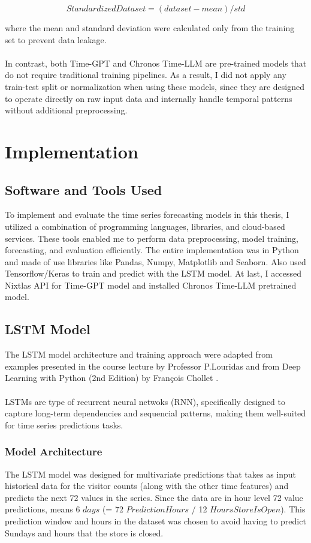 \documentclass{article}
\begin{document}
\begin{equation}
    Standardized Dataset = (dataset - mean) / std
\end{equation}

where the mean and standard deviation were calculated only from the training set to prevent data leakage.\\
\\
In contrast, both Time-GPT and Chronos Time-LLM are pre-trained models that do not require traditional training pipelines. As a result, I did not apply any train-test split or normalization when using these models, since they are designed to operate directly on raw input data and internally handle temporal patterns without additional preprocessing.

\newpage
\section{Implementation}
\subsection{Software and Tools Used}

To implement and evaluate the time series forecasting models in this thesis, I utilized a combination of programming languages, libraries, and cloud-based services. These tools enabled me to perform data preprocessing, model training, forecasting, and evaluation efficiently.
The entire implementation was in Python and made of use libraries like Pandas, Numpy, Matplotlib and Seaborn. Also used Tensorflow/Keras to train and predict with the LSTM model. At last, I accessed Nixtlas API for Time-GPT model and installed Chronos Time-LLM pretrained model.


\subsection{LSTM Model}
The LSTM model architecture and training approach were adapted from examples presented in the course lecture by Professor P.Louridas and from Deep Learning with Python (2nd Edition) by François Chollet \cite{Francois}. \\
\\
LSTMs are type of recurrent neural netwoks (RNN), specifically designed to capture long-term dependencies and sequencial patterns, making them well-suited for time series predictions tasks.

\subsubsection{Model Architecture}
The LSTM model was designed for multivariate predictions that takes as input historical data for the visitor counts (along with the other time features) and predicts the next 72 values in the series. Since the data are in hour level 72 value predictions, means 6 $days$ (= 72 $PredictionHours$ / 12 $HoursStoreIsOpen$). This prediction window and hours in the dataset was chosen to avoid having to predict Sundays and hours that the store is closed.
\end{document}
